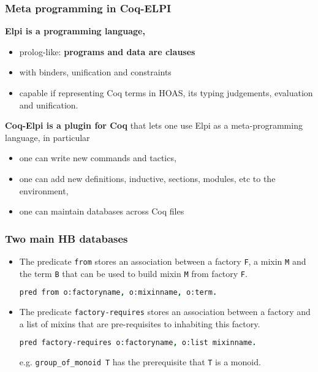 \documentclass[11pt]{beamer}
\let\L=\lstinline
\begin{document}
\begin{frame}
  \frametitle{Meta programming in {\sc Coq-ELPI}}

  \textbf{{\sc Elpi} is a programming language,}
  \begin{itemize}
  \item prolog-like: \textbf{programs and data are clauses}
  \item with binders, unification and constraints
    \pause
  \item capable if representing {\sc Coq} terms in HOAS, its typing
    judgements, evaluation and unification.
  \end{itemize}
    \pause
    \vfill

  \textbf{{\sc Coq-Elpi} is a plugin for {\sc Coq}} that lets one use {\sc Elpi} as a
    meta-programming language, \pause in particular
  \begin{itemize}
  \item one can write new commands and tactics,
  \item one can add new definitions, inductive, sections, modules, etc
    to the environment,
  \item one can maintain databases across {\sc Coq} files
  \end{itemize}

\end{frame}

\begin{frame}[fragile]
  \frametitle{Two main HB databases}

  \begin{itemize}
  \item The predicate \L{from} stores an association between a factory
    \L{F}, a mixin \L{M} and the term \L{B} that can be used to build
    mixin \L{M} from factory \L{F}.
\begin{lstlisting}[language=Prolog, basicstyle=\footnotesize]
pred from o:factoryname, o:mixinname, o:term.
\end{lstlisting}
\vfill
  \item The predicate {\footnotesize\tt factory-requires} stores an
    association between a factory and a list of mixins that are
    pre-requisites to inhabiting this factory.
\begin{lstlisting}[language=Prolog, basicstyle=\footnotesize]
pred factory-requires o:factoryname, o:list mixinname.
\end{lstlisting}
    e.g. \L{group_of_monoid T} has the prerequisite that \L{T} is a
    monoid.
  \end{itemize}

\end{frame}
\end{document}
